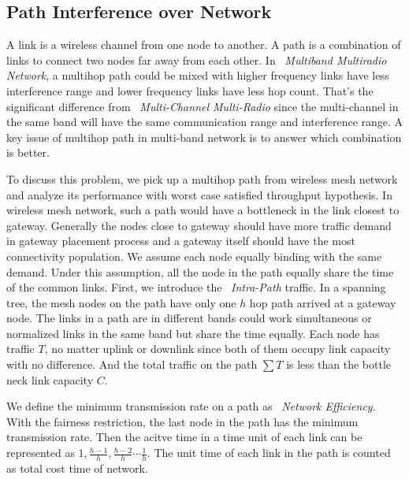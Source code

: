 \subsection{Path Interference over Network}
\label{subsec:PEN}

A link is a wireless channel from one node to another. A path is a combination of links to connect two nodes far away from each other.
In ~\emph{Multiband Multiradio Network}, 
a multihop path could be mixed with higher frequency links have less interference range and lower frequency links have less hop count. That's the significant difference from ~\emph{Multi-Channel Multi-Radio} since the multi-channel in the same band will have the same communication range and interference range. 
A key issue of multihop path in multi-band network is to answer which combination is better.

To discuss this problem, we pick up a multihop path from wireless mesh network and analyze its performance with worst case satisfied throughput hypothesis. In wireless mesh network, such a path would have a bottleneck in the link closest to gateway.
Generally the nodes close to gateway should have more traffic demand in gateway placement process and a gateway itself should have the most connectivity population. 
We assume each node equally binding with the same demand.
Under this assumption, all the node in the path equally share the time of the common links. 
First, we introduce the ~\emph{Intra-Path} traffic. In a spanning tree, the mesh nodes on the path have only one $h$ hop path arrived at a gateway node.
The links in a path are in different bands could work simultaneous or normalized links in the same band but share the time equally.
Each node has traffic $T$, no matter uplink or downlink since both of them occupy link capacity with no difference. And the total traffic on the path $\sum T$ is less than the bottle neck link capacity $C$. 

We define the minimum transmission rate on a path as ~\emph{Network Efficiency}. 
With the fairness restriction, the last node in the path has the minimum transmission rate.
Then the acitve time in a time unit of each link can be represented as $1,\frac{h-1}{h},\frac{h-2}{h}\cdots \frac{1}{h}$. 
The unit time of each link in the path is counted as total cost time of network.


